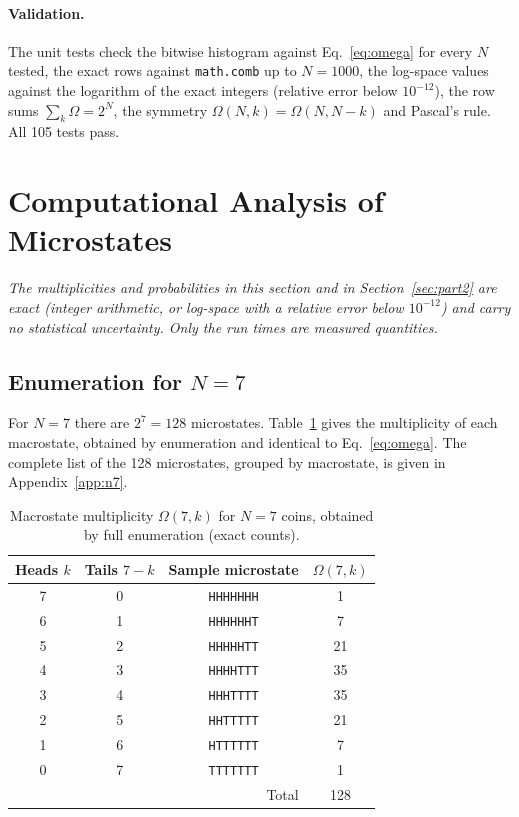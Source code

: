 \documentclass[11pt,a4paper]{article}
\begin{document}
\paragraph{Validation.} The unit tests check the bitwise histogram against Eq.~\eqref{eq:omega}
for every $N$ tested, the exact rows against \texttt{math.comb} up to $N=1000$, the log-space
values against the logarithm of the exact integers (relative error below $10^{-12}$), the row
sums $\sum_k\Omega=2^N$, the symmetry $\Omega(N,k)=\Omega(N,N-k)$ and Pascal's rule. All
105 tests pass.

\section{Computational Analysis of Microstates}
\label{sec:part1}
\textit{The multiplicities and probabilities in this section and in Section~\ref{sec:part2} are
exact (integer arithmetic, or log-space with a relative error below $10^{-12}$) and carry no
statistical uncertainty. Only the run times are measured quantities.}

\subsection{Enumeration for \texorpdfstring{$N=7$}{N = 7}}
For $N=7$ there are $2^7=128$ microstates. Table~\ref{tab:n7} gives the multiplicity of each
macrostate, obtained by enumeration and identical to Eq.~\eqref{eq:omega}. The complete list
of the 128 microstates, grouped by macrostate, is given in Appendix~\ref{app:n7}.

\begin{table}[H]
  \centering
  \small
  \begin{tabular}{cccc}
    \toprule
    Heads $k$ & Tails $7-k$ & Sample microstate & $\Omega(7,k)$ \\
    \midrule
    7 & 0 & \texttt{HHHHHHH} & 1 \\
    6 & 1 & \texttt{HHHHHHT} & 7 \\
    5 & 2 & \texttt{HHHHHTT} & 21 \\
    4 & 3 & \texttt{HHHHTTT} & 35 \\
    3 & 4 & \texttt{HHHTTTT} & 35 \\
    2 & 5 & \texttt{HHTTTTT} & 21 \\
    1 & 6 & \texttt{HTTTTTT} & 7 \\
    0 & 7 & \texttt{TTTTTTT} & 1 \\
    \midrule
    \multicolumn{3}{r}{Total} & 128 \\
    \bottomrule
  \end{tabular}
  \caption{Macrostate multiplicity $\Omega(7,k)$ for $N=7$ coins, obtained by full enumeration
  (exact counts).}
  \label{tab:n7}
\end{table}
\end{document}
